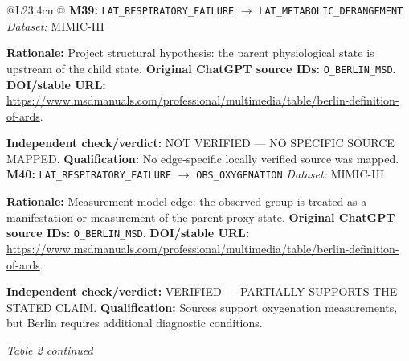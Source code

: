 \begin{tabular}{@{}L{23.4cm}@{}}
\midrule
\textbf{M39:} \nolinkurl{LAT_RESPIRATORY_FAILURE} $\rightarrow$ \nolinkurl{LAT_METABOLIC_DERANGEMENT} \hfill \textit{Dataset:} MIMIC-III\par\textbf{Rationale:} Project structural hypothesis: the parent physiological state is upstream of the child state. \textbf{Original ChatGPT source IDs:} \nolinkurl{O_BERLIN_MSD}. \textbf{DOI/stable URL:} \url{https://www.msdmanuals.com/professional/multimedia/table/berlin-definition-of-ards}.\par\textbf{Independent check/verdict:} NOT VERIFIED --- NO SPECIFIC SOURCE MAPPED. \textbf{Qualification:} No edge-specific locally verified source was mapped. \\
\addlinespace[2pt]
\midrule
\textbf{M40:} \nolinkurl{LAT_RESPIRATORY_FAILURE} $\rightarrow$ \nolinkurl{OBS_OXYGENATION} \hfill \textit{Dataset:} MIMIC-III\par\textbf{Rationale:} Measurement-model edge: the observed group is treated as a manifestation or measurement of the parent proxy state. \textbf{Original ChatGPT source IDs:} \nolinkurl{O_BERLIN_MSD}. \textbf{DOI/stable URL:} \url{https://www.msdmanuals.com/professional/multimedia/table/berlin-definition-of-ards}.\par\textbf{Independent check/verdict:} VERIFIED --- PARTIALLY SUPPORTS THE STATED CLAIM. \textbf{Qualification:} Sources support oxygenation measurements, but Berlin requires additional diagnostic conditions. \\
\addlinespace[2pt]
\midrule
\bottomrule
\end{tabular}
\clearpage
\textit{Table 2 continued}\par
